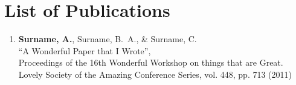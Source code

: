 \chapter{List of Publications}
\label{chapter:publications}


\begin{enumerate}

\item \textbf{Surname, A.}, Surname, B.~A., \& Surname, C.\\
``A Wonderful Paper that I Wrote'', \\
Proceedings of the 16th Wonderful Workshop on things that are Great.  
Lovely Society of the Amazing Conference Series, vol. 448, pp. 713 (2011)

\end{enumerate}

